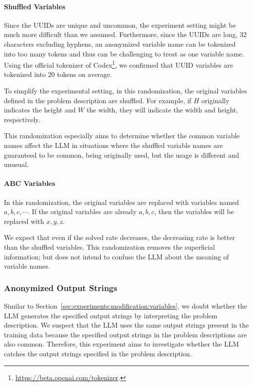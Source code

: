 \documentclass{article}
\begin{document}
\paragraph{Shuffled Variables}

Since the UUIDs are unique and uncommon, the experiment setting might be much more difficult than we assumed.
Furthermore, since the UUIDs are long, 32 characters excluding hyphens, an anonymized variable name can be tokenized into too many tokens and thus can be challenging to treat as one variable name.
Using the official tokenizer of Codex\footnote{\url{https://beta.openai.com/tokenizer}.}, we confirmed that UUID variables are tokenized into 20 tokens on average.

To simplify the experimental setting, in this randomization, the original variables defined in the problem description are shuffled.
For example, if $H$ originally indicates the height and $W$ the width, they will indicate the width and height, respectively.

This randomization especially aims to determine whether the common variable names affect the LLM in situations where the shuffled variable names are guaranteed to be common, being originally used, but the usage is different and unusual.



\paragraph{ABC Variables}

In this randomization, the original variables are replaced with variables named $a, b, c, \cdots$.
If the original variables are already $a, b, c$, then the variables will be replaced with $x, y, z$.

We expect that even if the solved rate decreases, the decreasing rate is better than the shuffled variables.
This randomization removes the superficial information; but does not intend to confuse the LLM about the meaning of variable names.





\subsubsection{Anonymized Output Strings}
\label{sec:experiments:modification:outputs}

Similar to Section~\ref{sec:experiments:modification:variables}, we doubt whether the LLM generates the specified output strings by interpreting the problem description.
We suspect that the LLM uses the same output strings present in the training data because the specified output strings in the problem descriptions are also common.
Therefore, this experiment aims to investigate whether the LLM catches the output strings specified in the problem description.
\end{document}
